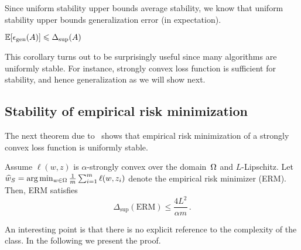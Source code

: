 Since uniform stability upper bounds average stability, we know that uniform
stability upper bounds generalization error (in expectation).
%
\begin{corollary}
$\operatorname*{\mathbb{E}}[\epsilon_{\text{gen}}(A)] \leqslant \Delta_{\sup} (A)$
\end{corollary}

This corollary turns out to be surprisingly useful since many algorithms are
uniformly stable. For instance, strongly convex loss function is sufficient for
stability, and hence generalization as we will show next.

\subsection{Stability of empirical risk minimization}

The next theorem due to~\cite{Shalev2010LearnabilitySA} shows that empirical
risk minimization of a strongly convex loss function is uniformly stable.

\begin{theorem}
Assume $\ell(w, z)$ is $\alpha$-strongly convex over the domain~$\Omega$
and $L$-Lipschitz. 
Let $\widehat w_S = \arg \min_{w\in \Omega} \frac{1}{m} \sum_{i=1}^m \ell(w, z_i)$
denote the empirical risk minimizer (ERM).
Then, ERM satisfies
\begin{equation*}
\Delta_{\sup} (\text{ERM}) \leq \frac{4L^2}{\alpha m}\,.
\end{equation*}
\end{theorem}

An interesting point is that there is no explicit reference to the complexity of
the class. In the following we present the proof.

